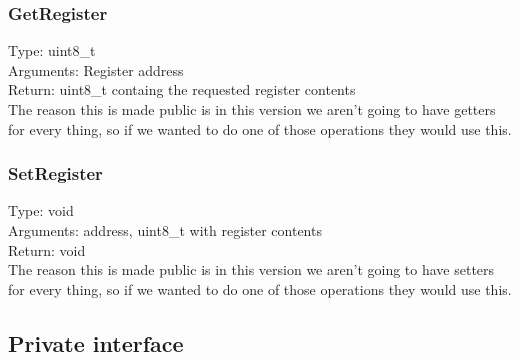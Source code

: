 \documentclass[letterpaper,11pt]{article}
\begin{document}
		\subsubsection{GetRegister}
		Type: uint8\_t\\
		Arguments: Register address\\
		Return: uint8\_t containg the requested register contents\\
		The reason this is made public is in this version we aren't going to have getters for every thing, so if we wanted to do one of those operations they would use this.
		\subsubsection{SetRegister}
		Type: void\\
		Arguments: address, uint8\_t with register contents\\
		Return: void\\
		The reason this is made public is in this version we aren't going to have setters for every thing, so if we wanted to do one of those operations they would use this.
	\subsection{Private interface}
\end{document}
